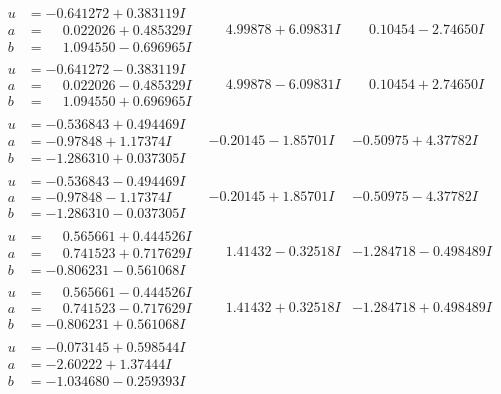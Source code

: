 \documentclass[1p]{elsarticle_modified}
\theoremstyle{definition}
\begin{document}
$$\begin{array}{c|c|c}
\begin{aligned}
u &= -0.641272 + 0.383119 I \\
a &= \phantom{-}0.022026 + 0.485329 I \\
b &= \phantom{-}1.094550 - 0.696965 I\end{aligned}
 & \phantom{-}4.99878 + 6.09831 I & \phantom{-}0.10454 - 2.74650 I \\ \hline\begin{aligned}
u &= -0.641272 - 0.383119 I \\
a &= \phantom{-}0.022026 - 0.485329 I \\
b &= \phantom{-}1.094550 + 0.696965 I\end{aligned}
 & \phantom{-}4.99878 - 6.09831 I & \phantom{-}0.10454 + 2.74650 I \\ \hline\begin{aligned}
u &= -0.536843 + 0.494469 I \\
a &= -0.97848 + 1.17374 I \\
b &= -1.286310 + 0.037305 I\end{aligned}
 & -0.20145 - 1.85701 I & -0.50975 + 4.37782 I \\ \hline\begin{aligned}
u &= -0.536843 - 0.494469 I \\
a &= -0.97848 - 1.17374 I \\
b &= -1.286310 - 0.037305 I\end{aligned}
 & -0.20145 + 1.85701 I & -0.50975 - 4.37782 I \\ \hline\begin{aligned}
u &= \phantom{-}0.565661 + 0.444526 I \\
a &= \phantom{-}0.741523 + 0.717629 I \\
b &= -0.806231 - 0.561068 I\end{aligned}
 & \phantom{-}1.41432 - 0.32518 I & -1.284718 - 0.498489 I \\ \hline\begin{aligned}
u &= \phantom{-}0.565661 - 0.444526 I \\
a &= \phantom{-}0.741523 - 0.717629 I \\
b &= -0.806231 + 0.561068 I\end{aligned}
 & \phantom{-}1.41432 + 0.32518 I & -1.284718 + 0.498489 I \\ \hline\begin{aligned}
u &= -0.073145 + 0.598544 I \\
a &= -2.60222 + 1.37444 I \\
b &= -1.034680 - 0.259393 I\end{aligned}

\end{array}$$
\end{document}

